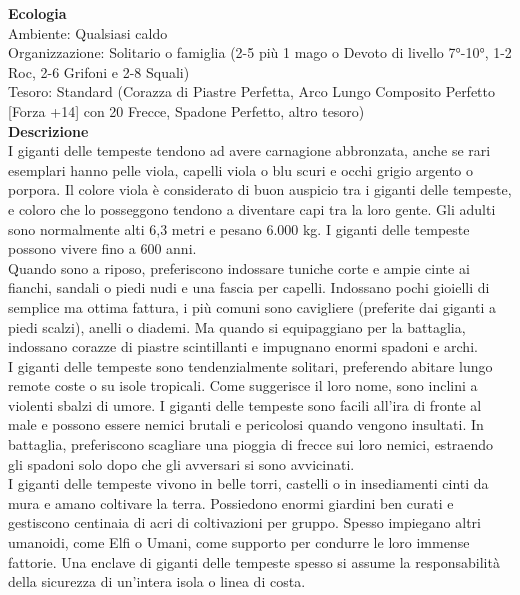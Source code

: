 \begin{multicols}{2}
\textbf{Ecologia}\\
Ambiente: Qualsiasi caldo\\
Organizzazione: Solitario o famiglia (2-5 più 1 mago o Devoto di livello 7°-10°, 1-2 Roc, 2-6 Grifoni e 2-8 Squali)\\
Tesoro: Standard (Corazza di Piastre Perfetta, Arco Lungo Composito Perfetto [Forza +14] con 20 Frecce, Spadone Perfetto, altro tesoro)\\
\textbf{Descrizione}\\
I giganti delle tempeste tendono ad avere carnagione abbronzata, anche se rari esemplari hanno pelle viola, capelli viola o blu scuri e occhi grigio argento o porpora. Il colore viola è considerato di buon auspicio tra i giganti delle tempeste, e coloro che lo posseggono tendono a diventare capi tra la loro gente. Gli adulti sono normalmente alti 6,3 metri e pesano 6.000 kg. I giganti delle tempeste possono vivere fino a 600 anni.\\

Quando sono a riposo, preferiscono indossare tuniche corte e ampie cinte ai fianchi, sandali o piedi nudi e una fascia per capelli. Indossano pochi gioielli di semplice ma ottima fattura, i più comuni sono cavigliere (preferite dai giganti a piedi scalzi), anelli o diademi. Ma quando si equipaggiano per la battaglia, indossano corazze di piastre scintillanti e impugnano enormi spadoni e archi.\\

I giganti delle tempeste sono tendenzialmente solitari, preferendo abitare lungo remote coste o su isole tropicali. Come suggerisce il loro nome, sono inclini a violenti sbalzi di umore. I giganti delle tempeste sono facili all'ira di fronte al male e possono essere nemici brutali e pericolosi quando vengono insultati. In battaglia, preferiscono scagliare una pioggia di frecce sui loro nemici, estraendo gli spadoni solo dopo che gli avversari si sono avvicinati.\\

I giganti delle tempeste vivono in belle torri, castelli o in insediamenti cinti da mura e amano coltivare la terra. Possiedono enormi giardini ben curati e gestiscono centinaia di acri di coltivazioni per gruppo. Spesso impiegano altri umanoidi, come Elfi o Umani, come supporto per condurre le loro immense fattorie. Una enclave di giganti delle tempeste spesso si assume la responsabilità della sicurezza di un'intera isola o linea di costa.\\



\end{multicols}
